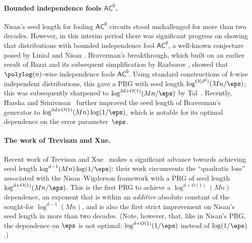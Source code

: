 \documentclass{toc}
\theoremstyle{plain}
\newcommand{\acz}{\mathsf{AC^0}}
\begin{document}
\vspace{-5pt}
\paragraph{Bounded independence fools $\acz$.} 
Nisan's seed length for fooling $\acz$ circuits stood
%
unchallenged  %
for more than two decades.  However, in this interim period there was significant progress on showing that distributions with bounded independence fool $\acz$, a well-known conjecture posed by Linial and Nisan \cite{LinialNisan:90}.  Braverman's breakthrough, %
%
which built on an earlier result of Bazzi \cite{Baz09} and its subsequent simplification by Razborov \cite{Raz09}, showed that $\polylog(n)$-wise independence fools $\acz$.  Using standard constructions of $k$-wise independent distributions, this gave a PRG with seed length $\log^{O(d^2)}(Mn/\eps)$; this was subsequently sharpened to $\log^{3d+O(1)}(Mn/\eps)$ by Tal~\cite{Tal:15tightbounds}.  Recently, Harsha and Srinivasan~\cite{HS16journal} further improved the seed length of Braverman's generator to $\log^{3d+O(1)}(Mn) \log(1/\eps)$, which is notable for its optimal dependence on the error parameter~$\eps$.



\vspace{-5pt} 
\paragraph{The work of Trevisan and Xue.} Recent work of Trevisan and Xue~\cite{TX13} makes a significant advance towards achieving seed length $\log^{d-1}(Mn)\log(1/\eps)$: their work circumvents the ``quadratic loss'' associated with the Nisan--Wigderson framework with a PRG of seed length $\log^{d+O(1)}(Mn/\eps)$.  This is the first PRG to achieve a $\log^{d+O(1)}(Mn)$ dependence, an exponent that is within an \emph{additive} absolute constant of the sought-for $\log^{d-1}(Mn)$, and is also the first strict improvement on Nisan's seed length in more than two decades. 
(Note, however, that, %
%
like in Nisan's PRG,  %
the dependence on $\eps$ is %
%
%
%
not optimal:  
$\log^{d+O(1)}(1/\eps)$ instead of $\log(1/\eps)$.)
\end{document}
